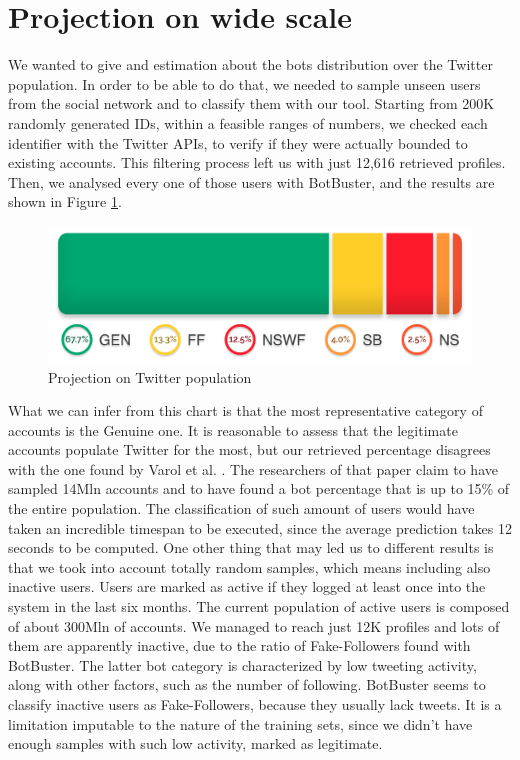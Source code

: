 \section{Projection on wide scale}
We wanted to give and estimation about the bots distribution over the Twitter population. In order to be able to do that, we needed to sample unseen users from the social network and to classify them with our tool.
Starting from 200K randomly generated IDs, within a feasible ranges of numbers, we checked each identifier with the Twitter APIs, to verify if they were actually bounded to existing accounts.
This filtering process left us with just 12,616 retrieved profiles.
Then, we analysed every one of those users with BotBuster, and the results are shown in Figure \ref{fig:projection}.
\begin{figure}[htp!]
	\begin{center}
		\includegraphics[width=\columnwidth]{chapter8/figure/projection.png}
	\end{center}
	\caption{Projection on Twitter population}
	\label{fig:projection}
\end{figure}

What we can infer from this chart is that the most representative category of accounts is the Genuine one.
It is reasonable to assess that the legitimate accounts populate Twitter for the most, but our retrieved percentage disagrees with the one found by Varol et al. \cite{Varol}. The researchers of that paper claim to have sampled 14Mln accounts and to have found a bot percentage that is up to 15\% of the entire population.
The classification of such amount of users would have taken an incredible timespan to be executed, since the average prediction takes 12 seconds to be computed.
One other thing that may led us to different results is that we took into account totally random samples, which means including also inactive users.
Users are marked as active if they logged at least once into the system in the last six months. The current population of active users is composed of about 300Mln of accounts. We managed to reach just 12K profiles and lots of them are apparently inactive, due to the ratio of Fake-Followers found with BotBuster. The latter bot category is characterized by low tweeting activity, along with other factors, such as the number of following. BotBuster seems to classify inactive users as Fake-Followers, because they usually lack tweets. It is a limitation imputable to the nature of the training sets, since we didn't have enough samples with such low activity, marked as legitimate.

